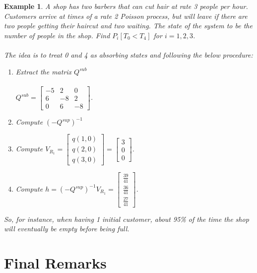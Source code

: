 \documentclass[12pt]{article}
\newtheorem{example}{Example}
\begin{document}
\begin{example}
    A shop has two barbers that can cut hair at rate 3 people per hour. Customers arrive at times of a rate 2 Poisson process, but will leave if there are two people getting their haircut and two waiting. The state of the system to be the number of people in the shop. Find $P_i[T_0 < T_4]$ for $i = 1,2,3$.
    \\
    \\The idea is to treat {0} and {4} as absorbing states and following the below procedure:
    \begin{enumerate}
        \item Extract the matrix $Q^{sub}$\\
        \\$Q^{sub} = \begin{bmatrix}
         -5 & 2 & 0\\
         6 & -8 & 2\\
         0 & 6 & -8
        \end{bmatrix}$.
        \item Compute $(-Q^{sup})^{-1}$
        \item Compute $V_{R_1} = \begin{bmatrix}
         q(1,0)\\
         q(2,0)\\
         q(3,0)
        \end{bmatrix} = \begin{bmatrix}
         3\\
         0\\
         0
        \end{bmatrix}$.
        \item Compute $h = (-Q^{sup})^{-1}V_{R_1} = \begin{bmatrix}
         \frac{39}{41}\\
         \frac{36}{41}\\
         \frac{27}{41}
        \end{bmatrix}$.
        
    \end{enumerate}
    So, for instance, when having 1 initial customer, about 95\% of the time the shop will eventually be empty before being full.
\end{example}

\section{Final Remarks}
\end{document}
